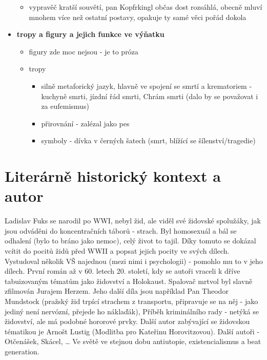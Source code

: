 \documentclass[11pt]{article}
\begin{document}
\begin{itemize}
\begin{itemize}
            \item vypravěč kratší souvětí, pan Kopfrkingl občas dost rozsáhlá, obecně mluví mnohem více než ostatní postavy, opakuje ty samé věci pořád dokola
        \end{itemize}
        \item\textbf{tropy a figury a jejich funkce ve výňatku}
        \begin{itemize}
            \item figury zde moc nejsou - je to próza
            \item tropy
            \begin{itemize}
                \item silně metaforický jazyk, hlavně ve spojení se smrtí a krematoriem - kuchyně smrti, jízdní řád smrti, Chrám smrti (dalo by se považovat i za eufemismus)
                \item přirovnání - zalézal jako pes
                \item symboly - dívka v černých šatech (smrt, blížící se šílenství/tragedie)
            \end{itemize}
        \end{itemize}
    \end{itemize}
    \section*{Literárně historický kontext a autor}
    Ladislav Fuks se narodil po WWI, nebyl žid, ale viděl své židovské spolužáky, jak jsou odváděni do koncentračních táborů - strach.
    Byl homosexuál a bál se odhalení (bylo to bráno jako nemoc), celý život to tajil. Díky tomuto se dokázal vcítit do pocitů židů před WWII a popsat jejich pocity ve svých dílech.
    Vystudoval několik VŠ najednou (mezi nimi i psychologii) - pomohlo mu to v jeho dílech. První román až v 60. letech 20. století, kdy se autoři vraceli k dříve tabuizovaným tématům jako židovství a Holokaust.
    Spalovač mrtvol byl slavně zfilmován Jurajem Herzem.
    Jeho další díla jsou například Pan Theodor Mundstock (pražský žid trpící strachem z transportu, připravuje se na něj - jako jediný není nervózní, přejede ho náklaďák), Příběh kriminálního rady - netýká se židovství, ale má podobné hororové prvky.
    Další autor zabývající se židovskou tématikou je Arnošt Lustig (Modlitba pro Kateřinu Horovitzovou). Další autoři - Otčenášek, Skácel, \dots
    Ve světě ve stejnou dobu antiutopie, existencialismus a beat generation.
\end{document}
